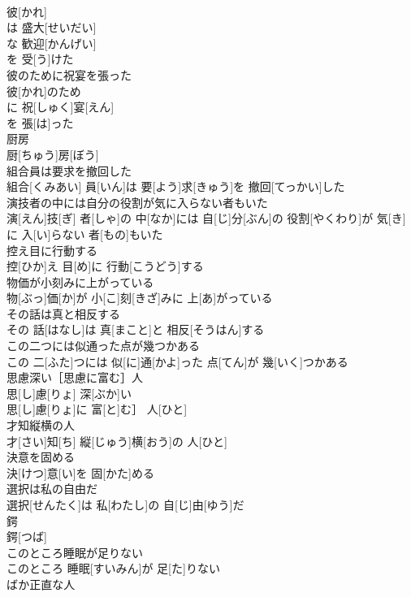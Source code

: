 \documentclass[8pt]{extreport}
\begin{document}
\begin{CJK}{UTF8}{min}
\\	彼[かれ]
\\	は 盛大[せいだい]
\\	な 歓迎[かんげい]
\\	を 受[う]けた 
\\	彼のために祝宴を張った	
\\	彼[かれ]のため 
\\	に 祝[しゅく]宴[えん] 
\\	を 張[は]った 
\\	厨房	
\\	厨[ちゅう]房[ぼう]
\\	組合員は要求を撤回した	
\\	組合[くみあい] 員[いん]は 要[よう]求[きゅう]を 撤回[てっかい]した
\\	演技者の中には自分の役割が気に入らない者もいた	
\\	演[えん]技[ぎ] 者[しゃ]の 中[なか]には 自[じ]分[ぶん]の 役割[やくわり]が 気[き]に 入[い]らない 者[もの]もいた
\\	控え目に行動する	
\\	控[ひか]え 目[め]に 行動[こうどう]する
\\	物価が小刻みに上がっている	
\\	物[ぶっ]価[か]が 小[こ]刻[きざ]みに 上[あ]がっている
\\	その話は真と相反する	
\\	その 話[はなし]は 真[まこと]と 相反[そうはん]する
\\	この二つには似通った点が幾つかある	
\\	この 二[ふた]つには 似[に]通[かよ]った 点[てん]が 幾[いく]つかある
\\	思慮深い［思慮に富む］人	
\\	思[し]慮[りょ] 深[ぶか]い
\\	思[し]慮[りょ]に 富[と]む］ 人[ひと]
\\	才知縦横の人	
\\	才[さい]知[ち] 縦[じゅう]横[おう]の 人[ひと]
\\	決意を固める	
\\	決[けつ]意[い]を 固[かた]める
\\	選択は私の自由だ	
\\	選択[せんたく]は 私[わたし]の 自[じ]由[ゆう]だ
\\	鍔	
\\	鍔[つば]
\\	このところ睡眠が足りない	
\\	このところ 睡眠[すいみん]が 足[た]りない
\\	ばか正直な人	

\end{CJK}
\end{document}
